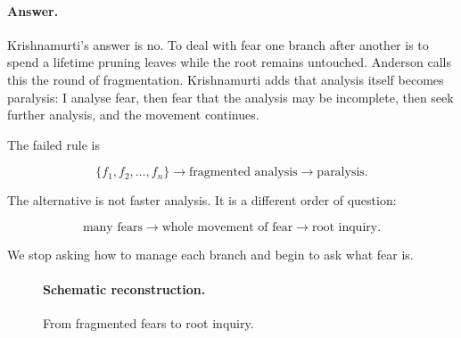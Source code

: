 \paragraph{Answer.}
Krishnamurti's answer is no. To deal with fear one branch after another is to spend a lifetime pruning leaves while the root remains untouched. Anderson calls this the round of fragmentation. Krishnamurti adds that analysis itself becomes paralysis: I analyse fear, then fear that the analysis may be incomplete, then seek further analysis, and the movement continues.

The failed rule is

\begin{equation}
\{f_1,f_2,\ldots,f_n\}
\longrightarrow
\text{fragmented analysis}
\longrightarrow
\text{paralysis}.
\end{equation}

The alternative is not faster analysis. It is a different order of question:

\begin{equation}
\text{many fears}
\longrightarrow
\text{whole movement of fear}
\longrightarrow
\text{root inquiry}.
\end{equation}

We stop asking how to manage each branch and begin to ask what fear is.

\begin{figure}
\centering
{}

\paragraph{Schematic reconstruction.}
From fragmented fears to root inquiry.
\end{figure}

